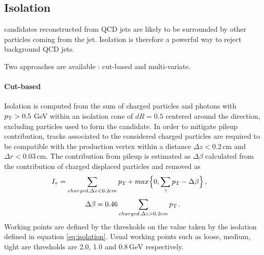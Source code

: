 \subsection{Isolation}


\tauh candidates reconstructed from QCD jets are likely to be surrounded by other particles coming from the jet.
Isolation is therefore a powerful way to reject background QCD jets.

Two approaches are available : cut-based and multi-variate.

\paragraph{Cut-based} Isolation is computed from the \pt sum of charged particles and photons with $p_{\mathrm{T}} > 0.5$ GeV within an isolation cone of $dR=0.5$ centered around the \tauh direction, excluding particles used to form the \tauh candidate. In order to mitigate pileup contribution, tracks associated to the considered charged particles are required to be compatible with the \tauh production vertex within a distance $\Delta z < 0.2\,\mathrm{cm}$ and $\Delta r < 0.03\,\mathrm{cm}$. The contribution from pileup is estimated as $\Delta \beta$ calculated from the contribution of charged displaced particles and removed as
\begin{equation}
    I_{\tau} = \sum_{charged, \Delta z<0.2 cm} \pt + max \Big\{ 0, \sum_{\gamma} \pt - \Delta\beta \Big\} \msep
    \label{eq:isolation}
\end{equation}
\begin{equation}
    \Delta \beta = 0.46 \sum_{charged,\Delta z>0.2 cm} \pt \mend
\end{equation}
Working points are defined by the thresholds on the value taken by the isolation defined in equation \ref{eq:isolation}. Usual working points such as loose, medium, tight are thresholds are 2.0, 1.0 and $0.8\,\mathrm{GeV}$ respectively.

